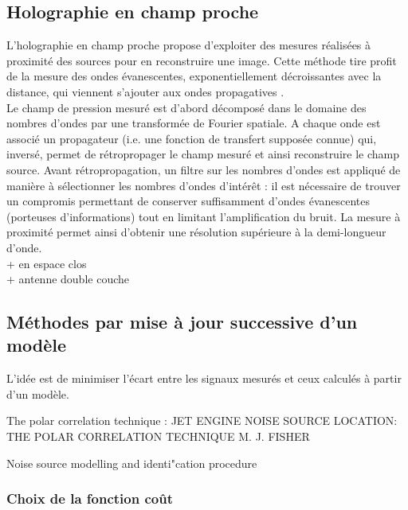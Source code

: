 \subsection{Holographie en champ proche}
L'holographie en champ proche propose d'exploiter des mesures réalisées à proximité des sources pour en reconstruire une image. Cette méthode tire profit de la mesure des ondes évanescentes, exponentiellement décroissantes avec la distance, qui viennent s'ajouter aux ondes propagatives \cite{Maynard1985}.\\
Le champ de pression mesuré est d'abord décomposé dans le domaine des nombres d'ondes par une transformée de Fourier spatiale. A chaque onde est associé un propagateur (i.e. une fonction de transfert supposée connue) qui, inversé, permet de rétropropager le champ mesuré et ainsi reconstruire le champ source.  Avant rétropropagation, un filtre sur les nombres d'ondes est appliqué de manière à sélectionner les nombres d'ondes d'intérêt : il est nécessaire de trouver un compromis permettant de conserver suffisamment d'ondes évanescentes (porteuses d'informations) tout en limitant l'amplification du bruit. La mesure à proximité permet ainsi d'obtenir une résolution supérieure à la demi-longueur d'onde.\\


+ en espace clos\\

+ antenne double couche



\subsection{Méthodes par mise à jour successive d'un modèle}
L'idée est de minimiser l'écart entre les signaux mesurés et ceux calculés à partir d'un modèle.

The polar correlation technique : JET ENGINE NOISE SOURCE LOCATION: 
THE 
POLAR 
CORRELATION 
TECHNIQUE 
M. 
J. 
FISHER

Noise source modelling and identi"cation procedure

\subsubsection{Choix de la fonction coût}

